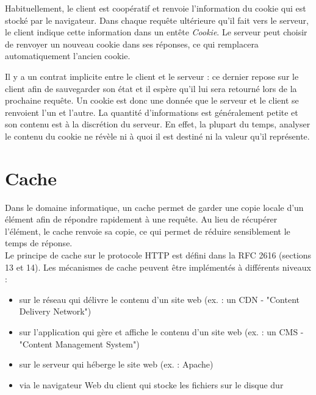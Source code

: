 Habituellement, le client est coopératif et renvoie l'information du cookie qui est stocké par le navigateur. Dans chaque requête ultérieure qu'il fait vers le serveur, le client indique cette information dans un entête \textit{Cookie}. Le serveur peut choisir de renvoyer un nouveau cookie dans ses réponses, ce qui remplacera automatiquement l'ancien cookie.
\newline

Il y a un contrat implicite entre le client et le serveur : ce dernier repose sur le client afin de sauvegarder son état et il espère qu'il lui sera retourné lors de la prochaine requête. Un cookie est donc une donnée que le serveur et le client se renvoient l'un et l'autre. La quantité d'informations est généralement petite et son contenu est à la discrétion du serveur. En effet, la plupart du temps, analyser le contenu du cookie ne révèle ni à quoi il est destiné ni la valeur qu'il représente.

\newpage
\section{Cache}
Dans le domaine informatique, un cache permet de garder une copie locale d'un élément afin de répondre rapidement à une requête. Au lieu de récupérer l'élément, le cache renvoie sa copie, ce qui permet de réduire sensiblement le temps de réponse.\\
Le principe de cache sur le protocole HTTP est défini dans la RFC 2616 \cite{IETF_RFC2616} (sections 13 et 14). Les mécanismes de cache peuvent être implémentés à différents niveaux :
\begin{itemize}
  \item sur le réseau qui délivre le contenu d'un site web (ex. : un CDN - "Content Delivery Network")
  \item sur l'application qui gère et affiche le contenu d'un site web (ex. : un CMS - "Content Management System")
  \item sur le serveur qui héberge le site web (ex. : Apache)
  \item via le navigateur Web du client qui stocke les fichiers sur le disque dur
  \newline
\end{itemize}

